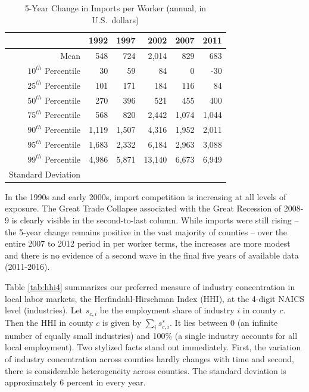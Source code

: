 \documentclass[onehalfspacing,11pt]{article}
\begin{document}
\begin{table}
  \centering 
  

  \begin{tabular*}{.85\textwidth}{@{\extracolsep{\fill}} rrrrrr}
\toprule
& 1992 & 1997 & 2002 & 2007 & 2011 \\
\midrule
Mean   & 548 & 724 & 2,014 & 829 & 683 \\
$10^{th}$ Percentile   & 30 & 59 & 84 & 0 & -30 \\
$25^{th}$ Percentile   & 101& 171 & 184 & 116 & 84\\
$50^{th}$ Percentile   & 270 & 396 & 521 & 455 & 400\\
$75^{th}$ Percentile   & 568 & 820 & 2,442 & 1,074 & 1,044\\
$90^{th}$ Percentile   & 1,119 & 1,507 & 4,316 & 1,952 & 2,011\\
$95^{th}$ Percentile   & 1,683 & 2,332 & 6,184 & 2,963 & 3,088\\
$99^{th}$ Percentile   & 4,986 & 5,871 & 13,140 & 6,673 & 6,949\\
Standard Deviation & \\
\bottomrule
\end{tabular*}
  \caption{5-Year Change in Imports per Worker (annual, in U.S.~dollars)}\label{tab:d5ipw}
\end{table}

In the 1990s and early 2000s, import competition is increasing at all levels of exposure. The Great Trade Collapse associated with the Great Recession of 2008-9 is clearly visible in the second-to-last column. While imports were still rising -- the 5-year change remains positive in the vast majority of counties -- over the entire 2007 to 2012 period in per worker terms, the increases are more modest and there is no evidence of a second wave in the final five years of available data (2011-2016).

Table \ref{tab:hhi4} summarizes our preferred measure of industry concentration in local labor markets, the Herfindahl-Hirschman Index (HHI), at the 4-digit NAICS level (industries). Let $s_{c,i}$ be the employment share of industry $i$ in county $c$. Then the HHI in county $c$ is given by $\sum_i s_{c,i}^s$. It lies between 0 (an infinite number of equally small industries) and 100\% (a single industry accounts for all local employment). Two stylized facts stand out immediately. First, the variation of industry concentration across counties hardly changes with time and second, there is considerable heterogeneity across counties. The standard deviation is approximately 6 percent in every year.
\end{document}
